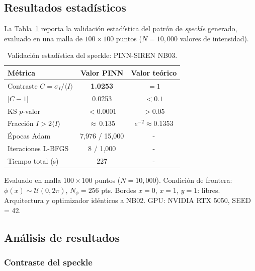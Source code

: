 \subsection{Resultados estadísticos}

La Tabla~\ref{tab:resultados_speckle} reporta la validación estadística del
patrón de \textit{speckle} generado, evaluado en una malla de
$100 \times 100$ puntos ($N = 10{,}000$ valores de intensidad).

\begin{table}[htbp]
\centering
\begin{threeparttable}
\caption{Validación estadística del speckle: PINN-SIREN NB03.}
\label{tab:resultados_speckle}
\begin{tabular}{lcc}
\toprule
Métrica & Valor PINN & Valor teórico \\
\midrule
Contraste $C = \sigma_I / \langle I \rangle$ & \textbf{1.0253} & $= 1$ \\
$|C - 1|$                                    & 0.0253          & $< 0.1$ \\
KS $p$-valor                                 & $< 0.0001$      & $> 0.05$ \\
Fracción $I > 2\langle I \rangle$            & ${\approx}\,0.135$ & $e^{-2} \approx 0.1353$ \\
\midrule
Épocas Adam                                  & 7{,}976 / 15{,}000 & - \\
Iteraciones L-BFGS                           & 8 / 1{,}000        & - \\
Tiempo total (s)                             & 227                & - \\
\bottomrule
\end{tabular}
\begin{tablenotes}\small
    \item Evaluado en malla $100 \times 100$ puntos ($N = 10{,}000$).
    Condición de frontera: $\phi(x) \sim \mathcal{U}(0, 2\pi)$,
    $N_\phi = 256$ pts. Bordes $x=0$, $x=1$, $y=1$: libres.
    Arquitectura y optimizador idénticos a NB02. GPU: NVIDIA RTX 5050, SEED = 42.
\end{tablenotes}
\end{threeparttable}
\end{table}

\subsection{Análisis de resultados}

\subsubsection{Contraste del speckle}

